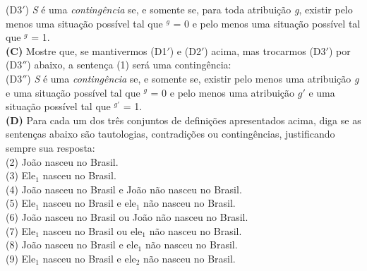 \begin{tcolorbox}[parbox=false,boxrule=0pt,sharp corners,breakable]
\n (D3$'$) \textit{S} é uma \textit{contingência} se, e somente
se, para toda atribuição \textit{g}, existir pelo menos uma
situação possível tal que $^{g}$ = 0 e pelo menos uma
situação possível tal que $^{g}$ = 1.\\


\n \textbf{(C)} Mostre que, se mantivermos (D1$'$) e (D2$'$) acima,
mas trocarmos (D3$'$) por (D3$''$) abaixo, a sentença (1) será uma
contingência:\\

\n (D3$''$) \textit{S} é uma \textit{contingência} se, e somente
se, existir pelo menos uma atribuição \textit{g} e uma situação
possível tal que $^{g}$ = 0 e pelo menos uma atribuição
$g\prime$ e uma situação possível tal que $^{g'}$ = 1.\\

\n \textbf{(D)} Para cada um dos três conjuntos de definições
apresentados acima, diga se as sentenças abaixo são tautologias,
contradições ou contingências, justificando sempre sua resposta:\\

(2) João nasceu no Brasil.\\

(3) Ele$_{1}$ nasceu no Brasil.\\

(4) João nasceu no Brasil e João não nasceu no Brasil.\\

(5) Ele$_{1}$ nasceu no Brasil e ele$_{1}$ não nasceu no Brasil.\\

(6) João nasceu no Brasil ou João não nasceu no Brasil.\\

(7) Ele$_{1}$ nasceu no Brasil ou ele$_{1}$ não nasceu no Brasil.\\

(8) João nasceu no Brasil e ele$_{1}$ não nasceu no Brasil.\\

(9) Ele$_{1}$ nasceu no Brasil e ele$_{2}$ não nasceu no Brasil.\\


\end{tcolorbox}




